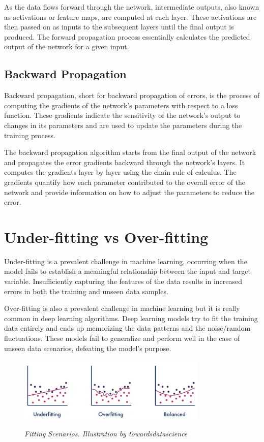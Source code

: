 As the data flows forward through the network, intermediate outputs, also known
as activations or feature maps, are computed at each layer. These activations
are then passed on as inputs to the subsequent layers until the final output is
produced. The forward propagation process essentially calculates the predicted
output of the network for a given input.

\subsection{Backward Propagation}

Backward propagation, short for backward propagation of errors, is the process
of computing the gradients of the network's parameters with respect to a loss
function. These gradients indicate the sensitivity of the network's output to
changes in its parameters and are used to update the parameters during the
training process. \newline

The backward propagation algorithm starts from the final output of the network
and propagates the error gradients backward through the network's layers. It
computes the gradients layer by layer using the chain rule of calculus. The
gradients quantify how each parameter contributed to the overall error of the
network and provide information on how to adjust the parameters to reduce the
error.


\section{Under-fitting vs Over-fitting}

Under-fitting is a prevalent challenge in machine learning, occurring when the
model fails to establish a meaningful relationship between the input and target
variable. Insufficiently capturing the features of the data results in
increased errors in both the training and unseen data samples. \newline

Over-fitting is also a prevalent challenge in machine learning but it is really
common in deep learning algorithms. Deep learning models try to fit the
training data entirely and ends up memorizing the data patterns and the
noise/random fluctuations. These models fail to generalize and perform well in
the case of unseen data scenarios, defeating the model's purpose. \newline

\begin{figure}[H]
  \centering
  \includegraphics[width=0.8\textwidth]{imatges/preliminaries/over-under-base.jpg}
  \caption[Fitting Scenarios]{\textit{Fitting Scenarios. Illustration by towardsdatascience}}
  {\label{fig:underfitting-overfitting-goodfitting}}
\end{figure}

